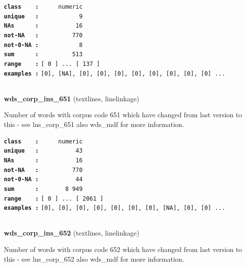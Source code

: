 \documentclass[]{article}
\begin{document}
\textbf{\texttt{class\ \ \ \ :}} \texttt{~~~~~numeric}\\
\textbf{\texttt{unique\ \ \ :}} \texttt{~~~~~~~~~~~9}\\
\textbf{\texttt{NAs\ \ \ \ \ \ :}} \texttt{~~~~~~~~~~16}\\
\textbf{\texttt{not-NA\ \ \ :}} \texttt{~~~~~~~~~770}\\
\textbf{\texttt{not-0-NA\ :}} \texttt{~~~~~~~~~~~8}\\
\textbf{\texttt{sum\ \ \ \ \ \ :}} \texttt{~~~~~~~~~513}\\
\textbf{\texttt{range\ \ \ \ :}}
\texttt{{[}\ 0\ {]}\ ...\ {[}\ 137\ {]}}\\
\textbf{\texttt{examples\ :}}
\texttt{{[}0{]},\ {[}NA{]},\ {[}0{]},\ {[}0{]},\ {[}0{]},\ {[}0{]},\ {[}0{]},\ {[}0{]},\ {[}0{]},\ {[}0{]}\ ...}\\

~

\textbf{wds\_corp\_ins\_651} (textlines, linelinkage)

Number of words with corpus code 651 which have changed from last
version to this - see lns\_corp\_651 also wds\_mdf for more information.

\textbf{\texttt{class\ \ \ \ :}} \texttt{~~~~~numeric}\\
\textbf{\texttt{unique\ \ \ :}} \texttt{~~~~~~~~~~43}\\
\textbf{\texttt{NAs\ \ \ \ \ \ :}} \texttt{~~~~~~~~~~16}\\
\textbf{\texttt{not-NA\ \ \ :}} \texttt{~~~~~~~~~770}\\
\textbf{\texttt{not-0-NA\ :}} \texttt{~~~~~~~~~~44}\\
\textbf{\texttt{sum\ \ \ \ \ \ :}} \texttt{~~~~~~~8~949}\\
\textbf{\texttt{range\ \ \ \ :}}
\texttt{{[}\ 0\ {]}\ ...\ {[}\ 2061\ {]}}\\
\textbf{\texttt{examples\ :}}
\texttt{{[}0{]},\ {[}0{]},\ {[}0{]},\ {[}0{]},\ {[}0{]},\ {[}0{]},\ {[}0{]},\ {[}NA{]},\ {[}0{]},\ {[}0{]}\ ...}\\

~

\textbf{wds\_corp\_ins\_652} (textlines, linelinkage)

Number of words with corpus code 652 which have changed from last
version to this - see lns\_corp\_652 also wds\_mdf for more information.
\end{document}
